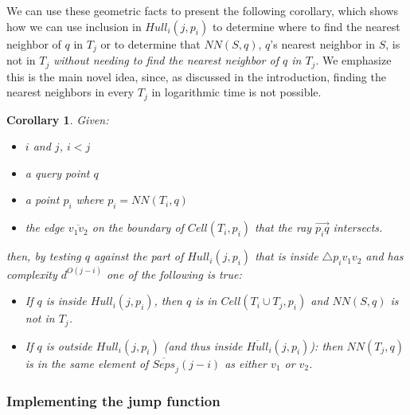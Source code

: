 \documentclass[10pt,a4paper]{amsart}
\newcommand{\ovar}[1]{\overrightarrow{#1}}
\newcommand{\Cell}{\mathit{Cell}}
\newcommand{\Hull}{\mathit{Hull}}
\newcommand{\NN}{\mathit{NN}}
\newtheorem{corollary}{Corollary}
\begin{document}
We can use these geometric facts to present the following corollary, which shows how we can use inclusion in $\Hull_i(j,p_i)$ to determine where to find the nearest neighbor of $q$ in $T_j$ or to determine that $\NN(S,q)$, $q$'s nearest neighbor in  $S$,  is not in $T_j$ \emph{without needing to find the nearest neighbor of $q$ in $T_j$}. We emphasize this is the main novel idea, since, as discussed in the introduction, finding the nearest neighbors in every $T_j$ in logarithmic time is not possible.

\begin{corollary}
    Given:
    \begin{itemize}
     \setlength{\itemsep}{1pt}
\setlength{\parskip}{0pt}
\setlength{\parsep}{0pt} 
        \item $i$ and $j$, $i<j$
        \item a query point $q$
        \item a point $p_i$ where $p_i=\NN(T_i,q)$
        \item the edge $\overline{v_1v_2}$ on the boundary of $\Cell(T_i,p_i)$ that the ray $\ovar{p_iq}$ intersects.
 \end{itemize}
 then, by testing $q$ against the part of $\Hull_i(j,p_i)$ that is inside $\triangle p_iv_1v_2$ and has complexity $d^{O(j-i)}$ one of the following is true:
\begin{itemize}
 \setlength{\itemsep}{1pt}
\setlength{\parskip}{0pt}
\setlength{\parsep}{0pt} 
\item If $q$ is inside $\Hull_i(j,p_i)$, then $q$ is in $\Cell(T_i \cup T_j,p_i)$ and $\NN(S,q)$ is not in $T_j$.
\item If $q$ is outside $\Hull_i(j,p_i)$ (and thus inside $\overline{\Hull}_i(j,p_i)$): then $\NN(T_j,q)$ is in the same element of $\overline{Seps}_j(j-i)$ as either $v_1$ or $v_2$.
\end{itemize}
\end{corollary}

\subsubsection{Implementing the jump function}
\end{document}

